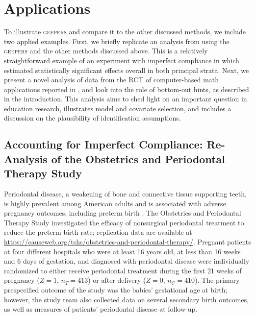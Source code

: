 \documentclass[]{article}
\begin{document}
\section{Applications}
To illustrate \textsc{geepers} and compare it to the other discussed methods, we include two applied examples.
First, we briefly replicate an analysis from \citet{richardson2023estimating} using the \textsc{geepers} and the other methods discussed above.
This is a relatively straightforward example of an experiment with imperfect compliance in which \citet{richardson2023estimating} estimated statistically significant effects overall in both principal strata.
Next, we present a novel analysis of data from the RCT of computer-based math applications reported in \citet{impactPaper}, and look into the role of bottom-out hints, as described in the introduction.
This analysis aims to shed light on an important question in education research, illustrates model and covariate selection, and includes a discussion on the plausibility of identification assumptions. 

\subsection{Accounting for Imperfect Compliance: Re-Analysis of the Obstetrics and Periodontal Therapy Study}
Periodontal disease, a weakening of bone and connective tissue supporting teeth, is highly prevalent among American adults and is associated with adverse pregnancy outcomes, including preterm birth \citep{periodontalEpi}.
The Obstetrics and Periodontal Therapy Study \citep[(OPTS)][]{michalowicz2006treatment} investigated the efficacy of nonsurgical periodontal treatment to reduce the preterm birth rate; replication data are available at \url{https://causeweb.org/tshs/obstetrics-and-periodontal-therapy/}.
Pregnant patients at four different hospitals who were at least 16 years old, at less than 16 weeks and 6 days of gestation, and diagnosed with periodontal disease were individually randomized to either receive periodontal treatment during the first 21 weeks of pregnancy ($Z=1$, $n_T=413$) or after delivery ($Z=0$, $n_C=410$).
The primary prespecified outcome of the study was the babies' gestational age at birth; however, the study team also collected data on several secondary birth outcomes, as well as measures of patients' periodontal disease at follow-up.
\end{document}
